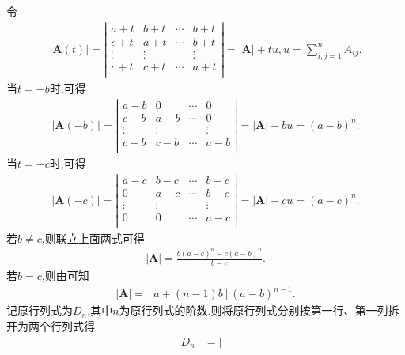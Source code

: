 \documentclass[../../main.tex]{subfiles}%
\begin{document}
\begin{solution}

{\color{blue}}
令
\begin{align*}
|\boldsymbol{A}(t)|=\left| \begin{matrix}
a+t&		b+t&		\cdots&		b+t\\
c+t&		a+t&		\cdots&		b+t\\
\vdots&		\vdots&		&		\vdots\\
c+t&		c+t&		\cdots&		a+t\\
\end{matrix} \right|=|\boldsymbol{A}|+tu,  u=\sum_{i,j=1}^n{A_{ij}.}
\nonumber
\end{align*}
当$t=-b$时,可得
\begin{align*}
|\boldsymbol{A}(-b)|=\left| \begin{matrix}
a-b&		0&		\cdots&		0\\
c-b&		a-b&		\cdots&		0\\
\vdots&		\vdots&		&		\vdots\\
c-b&		c-b&		\cdots&		a-b\\
\end{matrix} \right|=|\boldsymbol{A}|-bu=(a-b)^n.
\end{align*}
当$t=-c$时,可得
\begin{align*}
|\boldsymbol{A}(-c)|=\left| \begin{matrix}
a-c&		b-c&		\cdots&		b-c\\
0&		a-c&		\cdots&		b-c\\
\vdots&		\vdots&		&		\vdots\\
0&		0&		\cdots&		a-c\\
\end{matrix} \right|=|\boldsymbol{A}|-cu=(a-c)^n.
\end{align*}
若$b\ne c$,则联立上面两式可得
\begin{align}\label{eq:::2343135--fdg-13-12-3d}
\left| \boldsymbol{A} \right|=\frac{b\left( a-c \right) ^n-c\left( a-b \right) ^n}{b-c}.
\end{align}
若$b=c$,则由可知
\begin{align*}
|\boldsymbol{A}|=\left[ a+\left( n-1 \right) b \right] \left( a-b \right) ^{n-1}.
\end{align*}
{\color{blue}}
记原行列式为$D_n$,其中$n$为原行列式的阶数.则将原行列式分别按第一行、第一列拆开为两个行列式得
\begin{align*}
D_n&=\left| \begin{matrix}

\end{matrix}
\end{align*}
\end{solution}
\end{document}
